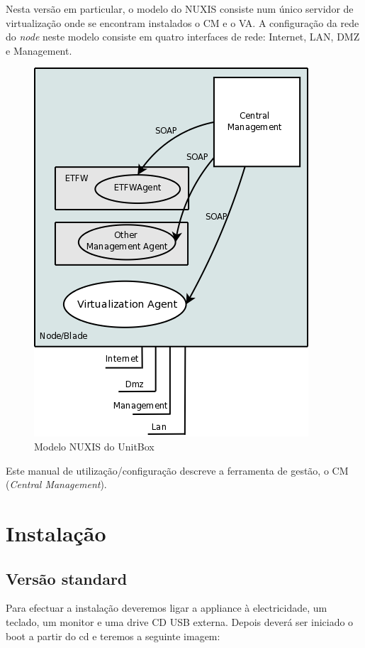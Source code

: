 Nesta versão em particular, o modelo do NUXIS consiste num único servidor de virtualização onde se encontram instalados o CM e o VA. A configuração da rede do \emph{node} neste modelo consiste em quatro interfaces de rede: Internet, LAN, DMZ e Management.
\begin{figure}[H]
    \begin{center}
	\includegraphics[scale=0.4]{screenshots/etva_standard.png}
	\caption{Modelo NUXIS do UnitBox}
	\label{fig:etva_standard}
	\end{center}
\end{figure}
 
Este manual de utilização/configuração descreve a ferramenta de gestão, o CM (\emph{Central Management}).

\pagebreak
\chapter{\textsf{Instalação}}
\label{chp:installation}
\section{Versão standard}

Para efectuar a instalação deveremos ligar a appliance à electricidade, um teclado, um monitor e uma drive CD USB externa.
Depois deverá ser iniciado o boot a partir do cd e teremos a seguinte imagem:

